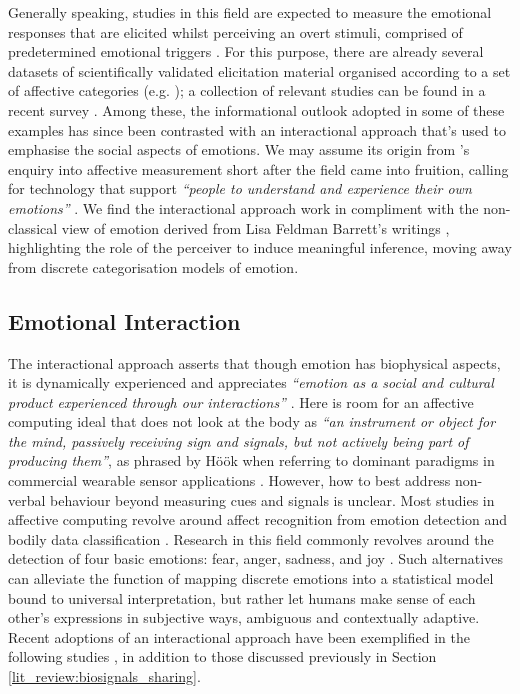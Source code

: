 Generally speaking, studies in this field are expected to measure the emotional responses that are elicited whilst perceiving an overt stimuli, comprised of predetermined emotional triggers \cite{bota_review_2019}. For this purpose, there are already several datasets of scientifically validated elicitation material organised according to a set of affective categories (e.g. \cite{yang_affective_2018,koelstra_deap_2012,bradley_affective_2007}); a collection of relevant studies can be found in a recent survey \cite{sanches_hci_2019}. Among these, the informational outlook adopted in some of these examples has since been contrasted with an interactional approach that's used to emphasise the social aspects of emotions. We may assume its origin from \citeauthor{boehner_how_2007}'s enquiry into affective measurement short after the field came into fruition, calling for technology that support \textit{``people to understand and experience their own emotions''} \cite{boehner_how_2007,boehner_affect_2005}. We find the interactional approach work in compliment with the non-classical view of emotion derived from Lisa Feldman Barrett's writings \cite{barrett_how_2017}, highlighting the role of the perceiver to induce meaningful inference, moving away from discrete categorisation models of emotion.

\subsection*{Emotional Interaction}

The interactional approach asserts that though emotion has biophysical aspects, it is dynamically experienced and appreciates \textit{``emotion as a social and cultural product experienced through our interactions''} \cite{boehner_how_2007}. Here is room for an affective computing ideal that does not look at the body as \textit{“an instrument or object for the mind, passively receiving sign and signals, but not actively being part of producing them”}, as phrased by Höök when referring to dominant paradigms in commercial wearable sensor applications \cite{hook_kristina_affective_2012}. However, how to best address non-verbal behaviour beyond measuring cues and signals is unclear. Most studies in affective computing revolve around affect recognition from emotion detection and bodily data classification \cite{bota_review_2019}. Research in this field commonly revolves around the detection of four basic emotions: fear, anger, sadness, and joy \cite{picard_mit_nodate}. Such alternatives can alleviate the function of mapping discrete emotions into a statistical model bound to universal interpretation, but rather let humans make sense of each other's expressions in subjective ways, ambiguous and contextually adaptive. Recent adoptions of an interactional approach have been exemplified in the following studies \cite{sanches_ambiguity_2019,umair_thermopixels_2020,fosh_see_2013}, in addition to those discussed previously in Section \ref{lit_review:biosignals_sharing}.

